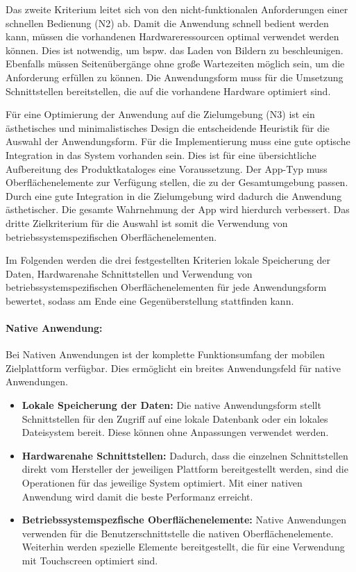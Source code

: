 Das zweite Kriterium leitet sich von den nicht-funktionalen Anforderungen einer schnellen Bedienung (N2) ab. Damit die Anwendung schnell bedient werden kann, müssen die vorhandenen Hardwareressourcen optimal verwendet werden können. Dies ist notwendig, um bspw. das Laden von Bildern zu beschleunigen. Ebenfalls müssen Seitenübergänge ohne große Wartezeiten möglich sein, um die Anforderung erfüllen zu können. Die Anwendungsform muss für die Umsetzung Schnittstellen bereitstellen, die auf die vorhandene Hardware optimiert sind.

Für eine Optimierung der Anwendung auf die Zielumgebung (N3) ist ein ästhetisches und minimalistisches Design die entscheidende Heuristik für die Auswahl der Anwendungsform. Für die Implementierung muss eine gute optische Integration in das System vorhanden sein. Dies ist für eine übersichtliche Aufbereitung des Produktkataloges eine Voraussetzung. Der App-Typ muss Oberflächenelemente zur Verfügung stellen, die zu der Gesamtumgebung passen. Durch eine gute Integration in die Zielumgebung wird dadurch die Anwendung ästhetischer. Die gesamte Wahrnehmung der App wird hierdurch verbessert. Das dritte Zielkriterium für die Auswahl ist somit die Verwendung von betriebssystemspezifischen Oberflächenelementen.    

Im Folgenden werden die drei festgestellten Kriterien lokale Speicherung der Daten, Hardwarenahe Schnittstellen und Verwendung von betriebssystemspezifischen Oberflächenelementen  für jede Anwendungsform bewertet, sodass am Ende eine Gegenüberstellung stattfinden kann.

\paragraph{Native Anwendung: }Bei Nativen Anwendungen ist der komplette Funktionsumfang der mobilen Zielplattform verfügbar. Dies ermöglicht ein breites Anwendungsfeld für native Anwendungen.
\begin{itemize}
\item \textbf{Lokale Speicherung der Daten:} Die native Anwendungsform stellt Schnittstellen für den Zugriff auf eine lokale Datenbank oder ein lokales Dateisystem bereit. Diese können ohne Anpassungen verwendet werden.

\item \textbf{Hardwarenahe Schnittstellen:} Dadurch, dass die einzelnen Schnittstellen direkt vom Hersteller der jeweiligen Plattform bereitgestellt werden, sind die Operationen für das jeweilige System optimiert. Mit einer nativen Anwendung wird damit die beste Performanz erreicht. 

\item \textbf{Betriebssystemspezfische Oberflächenelemente:} Native Anwendungen verwenden für die Benutzerschnittstelle die nativen Oberflächenelemente. Weiterhin werden spezielle Elemente bereitgestellt, die für eine Verwendung mit Touchscreen optimiert sind. 
\end{itemize}

